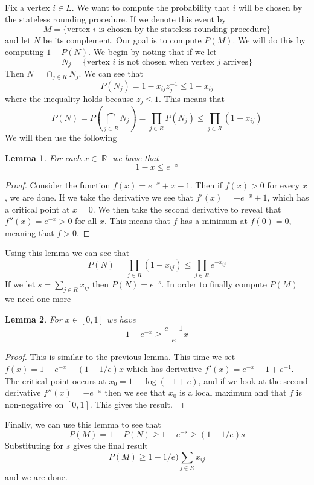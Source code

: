 \documentclass{article}
\DeclareMathOperator{\R}{\mathbb{R}}
\newcommand{\problem}[1]{\noindent {\bf #1}}
\newcommand{\problempart}[1]{\noindent{\textbf{(#1)}}}
\newtheorem*{lem}{Lemma}
\begin{document}
\problem{Problem 4.} \\
\problempart{a} Fix a vertex $i \in L$. We want to compute the probability that $i$ will be chosen by the stateless rounding procedure. If we denote this event by 
\[
M = \{\text{vertex } i \text{ is chosen by the stateless rounding procedure}\}
\]
and let $N$ be its complement. Our goal is to compute $P(M)$. We will do this by computing $1 - P(N)$. We begin by noting that if we let 
\[
N_j = \{\text{vertex } i \text{ is not chosen when vertex } j \text{ arrives}\}
\]
Then $N = \cap_{j \in R} N_j$. We can see that
\[
P(N_j) = 1 - x_{ij}z_j^{-1} \leq 1 - x_{ij}
\]
where the inequality holds because $z_j \leq 1$. This means that 
\[
P(N) = P(\bigcap_{j\in R} N_j) = \prod_{j\in R} P(N_j) \leq \prod_{j\in R} (1 - x_{ij}) 
\]
We will then use the following \\
\begin{lem}
For each $x \in \R$ we have that 
\[
1-x \leq e^{-x}
\]
\end{lem}
\begin{proof}
Consider the function $f(x) = e^{-x} + x - 1$. Then if $f(x) > 0$ for every $x$, we are done. If we take the derivative we see that $f'(x) = -e^{-x} + 1$, which has a critical point at $x = 0$. We then take the second derivative to reveal that $f''(x) = e^{-x} > 0$ for all $x$. This means that $f$ has a minimum at $f(0) = 0$, meaning that $f > 0$.  
\end{proof}
Using this lemma we can see that
\[
P(N) = \prod_{j\in R} (1 - x_{ij})  \leq \prod_{j\in R} e^{-x_{ij}}
\]
If we let $s = \sum_{j\in R}x_{ij}$ then $P(N) = e^{-s}$. In order to finally compute $P(M)$ we need one more \\
\begin{lem}
For $x \in [0, 1]$ we have 
\[
1 - e^{-x} \geq \frac{e-1}{e}x
\]
\end{lem}
\begin{proof}
This is similar to the previous lemma. This time we set $f(x) = 1 - e^{-x} - (1-1/e)x$ which has derivative $f'(x) = e^{-x} - 1 + e^{-1}$. The critical point occurs at $x_0 = 1 - \log(-1 + e)$, and if we look at the second derivative $f''(x) = -e^{-x}$ then we see that $x_0$ is a local maximum and that $f$ is non-negative on $[0,1]$. This gives the result.
\end{proof}
Finally, we can use this lemma to see that
\[
P(M) = 1 - P(N) \geq 1 - e^{-s} \geq (1 - 1/e)s 
\]
Substituting for $s$ gives the final result
\[
P(M) \geq 1 - 1/e)\sum_{j\in R} x_{ij}
\]
and we are done.

\problempart{b} 
\end{document}
